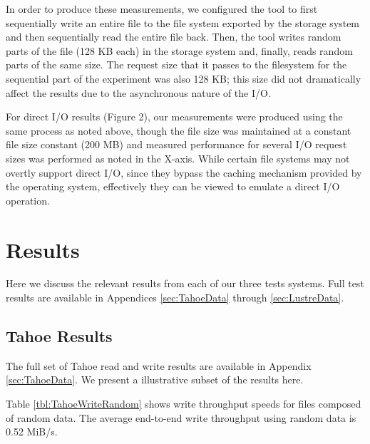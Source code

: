 \documentclass[11pt]{article}
\begin{document}
In order to produce these measurements, we configured the tool to first 
sequentially write an entire file to the file system exported by the storage 
system and then sequentially read the entire file back. Then, the tool writes 
random parts of the file (128 KB each) in the storage system and, finally, 
reads random parts of the same size. The request size that it passes to the 
filesystem for the sequential part of the experiment was also 128 KB; this 
size did not dramatically affect the results due to the asynchronous nature 
of the I/O. 

For direct I/O results (Figure 2), our measurements were produced using 
the same process as noted above, though the file size was maintained at 
a constant file size constant (200 MB) and measured performance for several 
I/O request sizes was performed as noted in the X-axis. While certain file 
systems may not overtly support direct I/O, since they bypass the caching 
mechanism provided by the operating system, effectively they can be viewed 
to emulate a direct I/O operation.


\section{Results}

Here we discuss the relevant results from each of our three tests
systems. Full test results are available in Appendices
\ref{sec:TahoeData} through \ref{sec:LustreData}.

\subsection{Tahoe Results}

The full set of Tahoe read and write results are available in Appendix
\ref{sec:TahoeData}. We present a illustrative subset of the results
here.

Table \ref{tbl:TahoeWriteRandom} shows write throughput speeds for files
composed of random data. The average end-to-end write throughput using
random data is 0.52 MiB/s.
\end{document}
